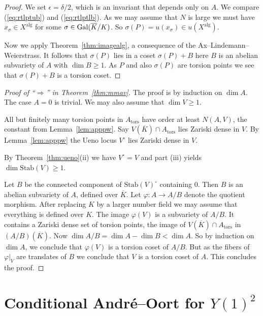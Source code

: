 \begin{proof}
  We set $\epsilon = \delta/2$, which is an invariant that depends only
  on $A$. We compare (\ref{eq:rtlptub}) and (\ref{eq:rtlptlb}). As we
  may assume that $N$ is large we must have $x_\sigma \in
  X^{\mathrm{alg}}$ for some $\sigma\in \mathrm{Gal}(\overline{K}/K)$. 
  So $\sigma(P) = u(x_\sigma)  \in u(X^{\mathrm{alg}})$.

  Now we apply Theorem~\ref{thm:imagealg}, a consequence of the
  Ax--Lindemann--Weierstrass. It follows that $\sigma(P)$ lies in a
  coset $\sigma(P)+B$ here $B$ is an abelian subvariety of $A$ with
  $\dim B\ge 1$. As $P$ and also $\sigma(P)$ are torsion points we see
  that $\sigma(P)+B$ is a torsion coset.
\end{proof}


\begin{proof}[Proof of ``$\Longrightarrow$'' in
  Theorem~\ref{thm:mmav}]
  The proof is by induction on $\dim A$. The case $A=0$ is trivial. 
  We may also assume that $\dim V\ge 1$.

  All but finitely many torsion
  points in $A_{\mathrm{tors}}$ have order at least $N(A,V)$, the
  constant from Lemma~\ref{lem:apppw}.
  Say $V(\overline K)\cap A_{\mathrm{tors}}$ lies Zariski dense in
  $V$. By Lemma~\ref{lem:apppw} 
  the Ueno locus $V^{\circ}$ lies Zariski dense in $V$.

  By Theorem~\ref{thm:ueno}(ii) we have $V^{\circ}=V$ and part (iii)
  yields $\dim \mathrm{Stab}(V) \ge 1$.

  Let $B$ be the connected component of $\mathrm{Stab}(V)^{\circ}$
  containing $0$. Then $B$ is an abelian subvariety of $A$, defined
  over $\overline K$. 
  Let $\varphi\colon A\rightarrow A/B$ denote the quotient morphism.
  After replacing $K$ by a larger number field we may assume that
  everything is defined over $K$.
  The image $\varphi(V)$ is a subvariety of $A/B$. It contains a
  Zariski dense set of torsion points, the image of $V(\overline
  K)\cap A_{\mathrm{tors}}$ in $(A/B)(\overline K)$.
  Now $\dim A/B = \dim A-\dim B<\dim A$. So by induction on $\dim A$,
  we conclude that $\varphi(V)$ is a torsion coset of $A/B$.
  But as the fibers of $\varphi|_V$ are translates of $B$ we conclude
  that $V$ is a torsion coset of $A$. This concludes the proof. 
\end{proof}

\section{Conditional Andr\'e--Oort for $Y(1)^2$}

